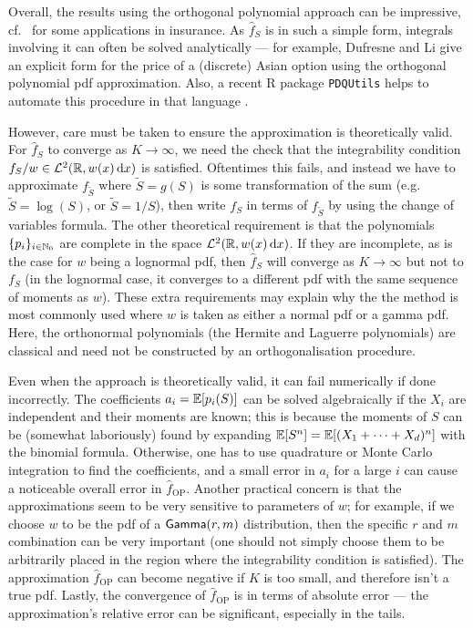 Overall, the results using the orthogonal polynomial approach can be impressive, cf.\ \cite{GoLoPo15,GoLoPo16} for some applications in insurance. As $\widehat{f}_S$ is in such a simple form, integrals involving it can often be solved analytically --- for example, Dufresne and Li \cite{dufresne2016pricing} give an explicit form for the price of a (discrete) Asian option using the orthogonal polynomial pdf approximation. Also, a recent R package \texttt{PDQUtils} helps to automate this procedure in that language \cite{PDQutilsManual}.


However, care must be taken to ensure the approximation is theoretically valid. For $\widehat{f}_S$ to converge as $K\to\infty$, we need the check that the integrability condition $f_S/w \in \mathcal{L}^2(\mathbb{R}, w(x) \mathop{}\!\mathrm{d} x)$ is satisfied. Oftentimes this fails, and instead we have to approximate $f_{\tilde{S}}$ where $\tilde{S} = g(S)$ is some transformation of the sum (e.g.\ $\tilde{S} = \log(S)$, or $\tilde{S} = 1/S$), then write $f_S$ in terms of $f_{\tilde{S}}$ by using the change of variables formula. The other theoretical requirement is that the polynomials $\{ p_i \}_{i\in\mathbb{N}_0}$ are complete in the space $\mathcal{L}^2(\mathbb{R}, w(x) \mathop{}\!\mathrm{d} x)$. If they are incomplete, as is the case for $w$ being a lognormal pdf, then $\widehat{f}_S$ will converge as $K\to\infty$ but not to $f_S$ (in the lognormal case, it converges to a different pdf with the same sequence of moments as $w$). These extra requirements may explain why the the method is most commonly used where $w$ is taken as either a normal pdf or a gamma pdf. Here, the orthonormal polynomials (the Hermite and Laguerre polynomials) are classical and need not be constructed by an orthogonalisation procedure.

Even when the approach is theoretically valid, it can fail numerically if done incorrectly. The coefficients $a_i = \operatorname{{\mathbb E}}[ p_i(S) ]$ can be solved algebraically if the $X_i$ are independent and their moments are known; this is because the moments of $S$ can be (somewhat laboriously) found by expanding $\operatorname{{\mathbb E}}[S^n] = \operatorname{{\mathbb E}}[(X_1 + \dots + X_d)^n]$ with the binomial formula. Otherwise, one has to use quadrature or Monte Carlo integration to find the coefficients, and a small error in $a_i$ for a large $i$ can cause a noticeable overall error in $\widehat{f}_{\mathrm{OP}}$. Another practical concern is that the approximations seem to be very sensitive to parameters of $w$; for example, if we choose $w$ to be the pdf of a $\mathsf{Gamma}(r,m)$ distribution, then the specific $r$ and $m$ combination can be very important (one should not simply choose them to be arbitrarily placed in the region where the integrability condition is satisfied). The approximation $\widehat{f}_{\mathrm{OP}}$ can become negative if $K$ is too small, and therefore isn't a true pdf. Lastly, the convergence of $\widehat{f}_{\mathrm{OP}}$ is in terms of absolute error --- the approximation's relative error can be significant, especially in the tails.

